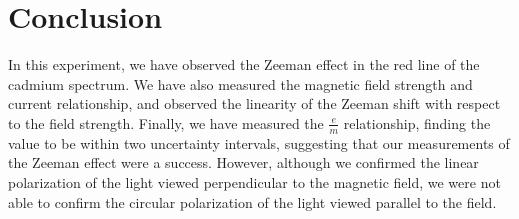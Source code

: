 \section{Conclusion}
\label{sec:conclusion}

In this experiment, we have observed the Zeeman effect in the red line of the cadmium spectrum. We have also measured the magnetic field strength and current relationship, and observed the linearity of the Zeeman shift with respect to the field strength. Finally, we have measured the $\frac{e}{m}$ relationship, finding the value to be within two uncertainty intervals, suggesting that our measurements of the Zeeman effect were a success. However, although we confirmed the linear polarization of the light viewed perpendicular to the magnetic field, we were not able to confirm the circular polarization of the light viewed parallel to the field.